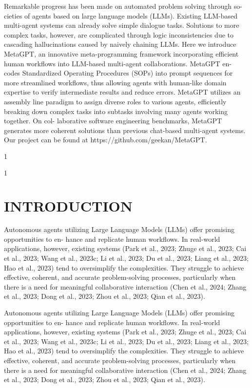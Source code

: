 \documentclass[12pt]{article}
\begin{document}
Remarkable progress has been made on automated problem solving through so-
cieties of agents based on large language models (LLMs). Existing LLM-based
multi-agent systems can already solve simple dialogue tasks. Solutions to more
complex tasks, however, are complicated through logic inconsistencies due to
cascading hallucinations caused by naively chaining LLMs. Here we introduce
MetaGPT, an innovative meta-programming framework incorporating efficient
human workflows into LLM-based multi-agent collaborations. MetaGPT en-
codes Standardized Operating Procedures (SOPs) into prompt sequences for more
streamlined workflows, thus allowing agents with human-like domain expertise
to verify intermediate results and reduce errors. MetaGPT utilizes an assembly
line paradigm to assign diverse roles to various agents, efficiently breaking down
complex tasks into subtasks involving many agents working together. On col-
laborative software engineering benchmarks, MetaGPT generates more coherent
solutions than previous chat-based multi-agent systems. Our project can be found
at https://github.com/geekan/MetaGPT.


1


1


\section{INTRODUCTION}


Autonomous agents utilizing Large Language Models (LLMs) offer promising opportunities to en-
hance and replicate human workflows. In real-world applications, however, existing systems (Park
et al., 2023; Zhuge et al., 2023; Cai et al., 2023; Wang et al., 2023c; Li et al., 2023; Du et al., 2023;
Liang et al., 2023; Hao et al., 2023) tend to oversimplify the complexities. They struggle to achieve
effective, coherent, and accurate problem-solving processes, particularly when there is a need for
meaningful collaborative interaction (Chen et al., 2024; Zhang et al., 2023; Dong et al., 2023; Zhou
et al., 2023; Qian et al., 2023).


Autonomous agents utilizing Large Language Models (LLMs) offer promising opportunities to en-
hance and replicate human workflows. In real-world applications, however, existing systems (Park
et al., 2023; Zhuge et al., 2023; Cai et al., 2023; Wang et al., 2023c; Li et al., 2023; Du et al., 2023;
Liang et al., 2023; Hao et al., 2023) tend to oversimplify the complexities. They struggle to achieve
effective, coherent, and accurate problem-solving processes, particularly when there is a need for
meaningful collaborative interaction (Chen et al., 2024; Zhang et al., 2023; Dong et al., 2023; Zhou
et al., 2023; Qian et al., 2023).
\end{document}
